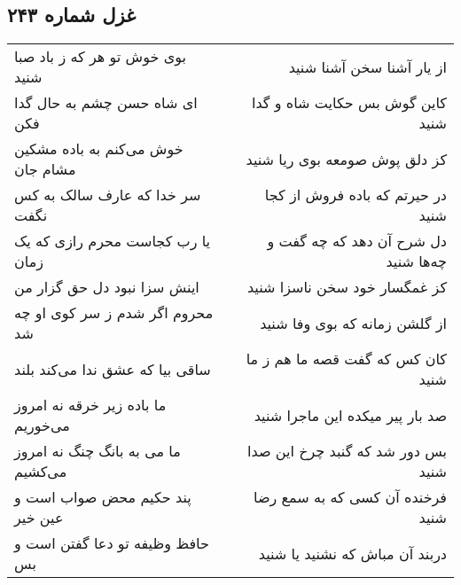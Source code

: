 \begin{center}
\section*{غزل شماره ۲۴۳}
\label{sec:sh243}
\begin{longtable}{l p{0.5cm} r}
بوی خوش تو هر که ز باد صبا شنید
&&
از یار آشنا سخن آشنا شنید
\\
ای شاه حسن چشم به حال گدا فکن
&&
کاین گوش بس حکایت شاه و گدا شنید
\\
خوش می‌کنم به باده مشکین مشام جان
&&
کز دلق پوش صومعه بوی ریا شنید
\\
سر خدا که عارف سالک به کس نگفت
&&
در حیرتم که باده فروش از کجا شنید
\\
یا رب کجاست محرم رازی که یک زمان
&&
دل شرح آن دهد که چه گفت و چه‌ها شنید
\\
اینش سزا نبود دل حق گزار من
&&
کز غمگسار خود سخن ناسزا شنید
\\
محروم اگر شدم ز سر کوی او چه شد
&&
از گلشن زمانه که بوی وفا شنید
\\
ساقی بیا که عشق ندا می‌کند بلند
&&
کان کس که گفت قصه ما هم ز ما شنید
\\
ما باده زیر خرقه نه امروز می‌خوریم
&&
صد بار پیر میکده این ماجرا شنید
\\
ما می به بانگ چنگ نه امروز می‌کشیم
&&
بس دور شد که گنبد چرخ این صدا شنید
\\
پند حکیم محض صواب است و عین خیر
&&
فرخنده آن کسی که به سمع رضا شنید
\\
حافظ وظیفه تو دعا گفتن است و بس
&&
دربند آن مباش که نشنید یا شنید
\\
\end{longtable}
\end{center}
